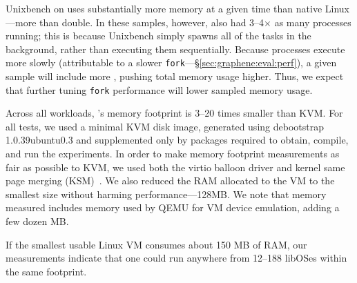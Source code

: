 Unixbench on \sysname{} uses substantially more memory at a given time than native Linux---more than double.
In these samples, however, \sysname{} also had 3--4$\times$ as many processes
running; this is because Unixbench simply spawns all of the tasks in the background, rather than
executing them sequentially.   Because \sysname{} processes execute more slowly (attributable to a slower {\tt fork}---\S\ref{sec:graphene:eval:perf}),
a given sample will include more \picoprocs{}, pushing total memory usage higher.
Thus, we expect that further tuning {\tt fork} performance will lower sampled memory usage.


Across all workloads, \sysname{}'s memory footprint is 3--20 times  
smaller than KVM.  
For all tests, we used a minimal KVM disk image, 
generated using debootstrap 1.0.39ubuntu0.3 and supplemented only by packages required to obtain, compile, and run the experiments.
In order to make memory footprint measurements as fair as possible to KVM, 
we used both the virtio balloon driver and kernel same page merging (KSM)~\citep{ksm}.
We also reduced the RAM allocated to the VM to the smallest size without harming performance---128MB.  We note that memory measured includes memory used by QEMU for VM device emulation, 
adding a few dozen MB.

If the smallest usable Linux VM consumes about 150 MB of RAM, our measurements indicate that 
one could run anywhere from 12--188 libOSes within the same footprint.


